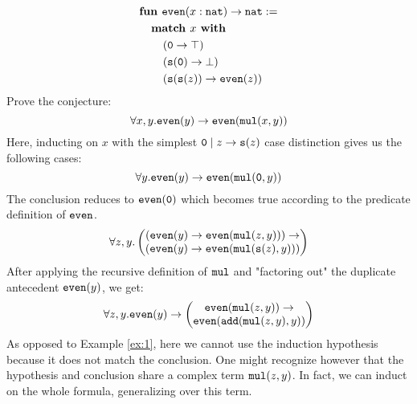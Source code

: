 \begin{example}
	\dotfill
	\begin{equation}
	\begin{aligned}
	\nonumber
	&\textbf{fun } \even (x : \nat) \rightarrow \nat :=\\
	&\tab\textbf{match } x \textbf{ with}\\
	&\tab\tab(\zero\rightarrow \top)\\
	&\tab\tab(\suc(\zero)\rightarrow \bot)\\
	&\tab\tab(\suc(\suc(z))\rightarrow \even(z))\end{aligned}\end{equation}
	Prove the conjecture:
	$$\forall x,y. \mathtt{even}(y)\rightarrow \mathtt{even}(\mathtt{mul}(x,y))$$
	Here, inducting on $x$ with the simplest $\mathtt{0} \mid z\rightarrow \mathtt{s}(z)$ case distinction gives us the following cases:
	$$\forall y. \mathtt{even}(y)\rightarrow \mathtt{even}(\mathtt{mul}(\mathtt{0},y))$$
	The conclusion reduces to $\mathtt{even}(\mathtt{0})$ which becomes true according to the predicate definition of $\mathtt{even}$.
	$$\forall z,y. \begin{pmatrix}(\mathtt{even}(y)\rightarrow \mathtt{even}(\mathtt{mul}(z,y)))\rightarrow\\
	(\mathtt{even}(y)\rightarrow \mathtt{even}(\mathtt{mul}(\mathtt{s}(z),y)))\end{pmatrix}$$
	After applying the recursive definition of $\mathtt{mul}$ and "factoring out" the duplicate antecedent $\mathtt{even}(y)$, we get:
	$$\forall z,y. \mathtt{even}(y)\rightarrow\begin{pmatrix}\mathtt{even}(\mathtt{mul}(z,y))\rightarrow\\
	\mathtt{even}(\mathtt{add}(\mathtt{mul}(z,y),y))\end{pmatrix}$$
	As opposed to Example \ref{ex:1}, here we cannot use the induction hypothesis because it does not match the conclusion. One might recognize however that the hypothesis and conclusion share a complex term $\mathtt{mul}(z,y)$. In fact, we can induct on the whole formula, generalizing over this term.


\end{example}
